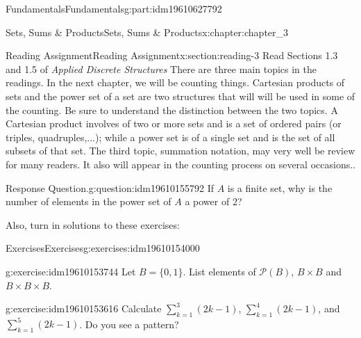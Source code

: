 \documentclass[oneside,10pt,]{book}
\numberwithin{equation}{section}
\begin{document}
\begin{partptx}{Fundamentals}{}{Fundamentals}{}{}{g:part:idm19610627792}
\begin{chapterptx}{Sets, Sums \& Products}{}{Sets, Sums \& Products}{}{}{x:chapter:chapter_3}
%
%
%
%
%
\typeout{************************************************}
\typeout{************************************************}
%
\begin{sectionptx}{Reading Assignment}{}{Reading Assignment}{}{}{x:section:reading-3}
Read Sections 1.3 and 1.5 of \emph{Applied Discrete Structures} There are three main topics in the readings.  In the next chapter, we will be counting things.  Cartesian products of sets and the power set of a set are two structures that will will be used in some of the counting.  Be sure to understand the distinction between the two topics.  A Cartesian product involves of two or more sets and is a set of ordered pairs (or triples, quadruples,...); while a power set is of a single set and is the set of all subsets of that set.    The third topic, summation notation, may very well be review for many readers. It also will appear in the counting process on several occasions..%
\begin{question}{Response Question.}{g:question:idm19610155792}%
If \(A\) is a finite set, why is the number of elements in the power set of \(A\) a power of 2?%
\end{question}
Also, turn in solutions to these exercises:%
%
%
\typeout{************************************************}
\typeout{************************************************}
%
\begin{exercises-subsection-numberless}{Exercises}{}{Exercises}{}{}{g:exercises:idm19610154000}
\par\medskip\noindent%
%
\begin{exercisegroup}
\begin{divisionexerciseeg}{1}{}{}{g:exercise:idm19610153744}%
Let \(B=\{0,1\}\).  List elements of  \(\mathcal{P}(B)\),  \(B\times B\) and \(B\times B\times B\).%
\end{divisionexerciseeg}%
\begin{divisionexerciseeg}{2}{}{}{g:exercise:idm19610153616}%
Calculate \(\sum_{k=1}^3 (2k-1)\), \(\sum_{k=1}^4 (2k-1)\), and \(\sum_{k=1}^5 (2k-1)\). Do you see a pattern?%
\end{divisionexerciseeg}%
\end{exercisegroup}
\par\medskip\noindent
\end{exercises-subsection-numberless}
\end{sectionptx}
%
%
\typeout{************************************************}

\end{chapterptx}
\end{partptx}
\end{document}
